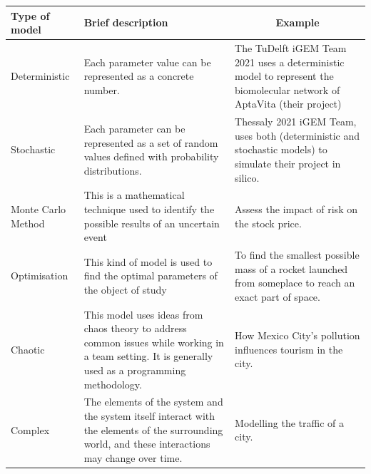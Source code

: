 \documentclass[11pt, letterpaper, english]{article}
\begin{document}
\begin{table}[h]

\begin{tabular}{ | m{3cm} | m{7cm}| m{6.2cm} | } 
\hline
\textbf{Type of model} & {\color[HTML]{000000} \textbf{Brief description}}                                                                                                    & \multicolumn{1}{c|}{\textbf{Example}}                                  \\ \hline
Deterministic                                 & Each parameter value can be represented as a concrete number.                                                                                        & The TuDelft iGEM Team 2021 uses a deterministic model to represent the biomolecular network of AptaVita (their project) \\ \hline
Stochastic                                    & Each parameter can be represented as a set of random values defined with probability distributions.                                                  & Thessaly 2021 iGEM Team, uses both (deterministic and stochastic models) to simulate their project in silico.             \\ \hline
Monte Carlo Method                            & This is a mathematical technique used to identify the possible results of an uncertain event                                                             &   Assess the impact of risk on the stock price. %
\\ \hline
Optimisation                                  & This kind of model is used to find the optimal parameters of the object of study                                                                     & To find the smallest possible mass of a rocket launched from someplace to reach an exact part of space.            \\ \hline
Chaotic                                       & This model uses ideas from chaos theory to address common issues while working in a team setting. It is generally used as a programming methodology. & How Mexico City's pollution influences tourism in the city.                                                             \\ \hline
Complex                                       & The elements of the system and the system itself interact with the elements of the surrounding world, and these interactions may change over time.   & Modelling the traffic of a city.                                                                                         \\ \hline
    
\end{tabular}
\end{table}
\end{document}
